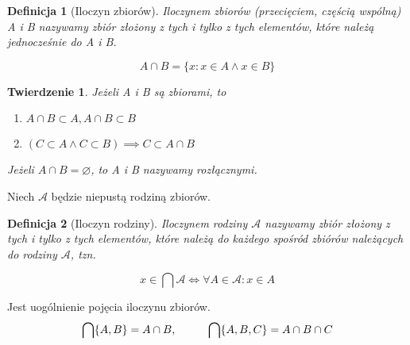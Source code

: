 \documentclass[a5paper,8pt]{article}
\theoremstyle{mythmstyle}
\newtheorem{definition}{Definicja}[section]
\newtheorem{theorem}{Twierdzenie}[section]
\newcommand\tab[1][1cm]{\hspace*{#1}}
\begin{document}
        \begin{definition}[Iloczyn zbiorów]
            Iloczynem zbiorów (przecięciem, częścią wspólną) A i B nazywamy zbiór złożony z tych i tylko z tych elementów, które należą jednocześnie do A i B.

            \begin{equation*}
                A \cap B = \{ x : x \in A \wedge x \in B \}
            \end{equation*}

        \end{definition}

        \begin{theorem}
            Jeżeli A i B są zbiorami, to

            \begin{enumerate}
                \item $ A \cap B \subset A, A \cap B \subset B $

                \item $ ( C \subset A \wedge C \subset B ) \implies C \subset A \cap B $
            \end{enumerate}
            
            Jeżeli $ A \cap B = \varnothing $, to A i B nazywamy rozłącznymi.                 
        \end{theorem}

        \pagebreak

        Niech $ \mathcal{A} $ będzie niepustą rodziną zbiorów.

        \begin{definition}[Iloczyn rodziny]
            Iloczynem rodziny $ \mathcal{A} $ nazywamy zbiór złożony z tych i tylko z tych
            elementów, które należą do każdego spośród zbiórów należących do rodziny $ \mathcal{A} $,
            tzn.

            \begin{equation*}
                x \in \bigcap \mathcal{A} \iff \forall A \in \mathcal{A} : x \in A
            \end{equation*}
        \end{definition}

        Jest uogólnienie pojęcia iloczynu zbiorów.
        \begin{equation*}
            \bigcap \{ A, B \} = A \cap B, \tab \bigcap \{ A, B, C \} = A \cap B \cap C
        \end{equation*}
\end{document}
